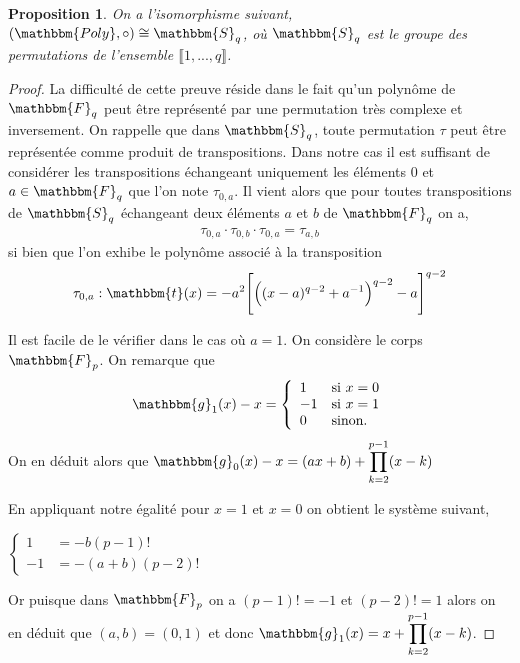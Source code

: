 \documentclass[12pt]{article}
\newtheorem{prop}{Proposition}
\theoremstyle{definition}
\begin{document}
\begin{prop}
 On a l'isomorphisme suivant, $(\mathbbm{Poly}, \circ) \cong \mathbbm{S}_q$, où $\mathbbm{S}_q$ est le groupe des permutations de l'ensemble $\llbracket 1, ... , q \rrbracket$.
\end{prop}

\begin{proof}
La difficulté de cette preuve réside dans le fait qu'un polynôme de $\mathbbm{F}_q$ peut être représenté par une permutation très complexe et inversement. On rappelle que dans $\mathbbm{S}_q$, toute permutation $\tau$ peut être représentée comme produit de transpositions. Dans notre cas il est suffisant de considérer les transpositions échangeant uniquement les éléments $0$ et $a \in \mathbbm{F}_q$ que l'on note $\tau_{0,a}$. Il vient alors que pour toutes transpositions de $\mathbbm{S}_q$ échangeant deux éléments $a$ et $b$ de $\mathbbm{F}_q$ on a,
\begin{align*}
\tau_{0,a} \cdot \tau_{0,b} \cdot \tau_{0,a} = \tau_{a,b}
\end{align*}
si bien que l'on exhibe le polynôme associé à la transposition
\begin{align*}
\tau_{0,a} : \mathbbm{t} (x) = -a^2 \Bigg [ \Big ((x-a)^{q-2} + a^{-1} \Big )^{q-2} - a \Bigg ]^{q-2}
\end{align*}

Il est facile de le vérifier dans le cas où $a = 1$. On considère le corps $\mathbbm{F}_p$. On remarque que 
	$$
\mathbbm{g}_1 (x) - x = \left\{
    \begin{array}{ll}
        1 & \mbox{si } x = 0 \\
       -1 & \mbox{si } x = 1 \\
       0 & \mbox{sinon.}
    \end{array}
\right.
$$
On en déduit alors que $\displaystyle \mathbbm{g}_0  (x)- x = (ax + b) +  \prod_{k=2}^{p-1} (x-k)$

En appliquant notre égalité pour $x=1$ et $x=0$ on obtient le système suivant,
\begin{center}
$
\left\{
    \begin{array}{ll}
    	1 &= -b(p-1)!\\
    	-1 &= -(a+b)(p-2)!
    \end{array}
\right.
$
\end{center}
Or puisque dans $\mathbbm{F}_p$ on a $(p-1)! = -1$ et $(p-2)! = 1$ alors on en déduit que $(a,b) = (0,1)$ et donc $\displaystyle \mathbbm{g}_1 (x) = x +  \prod_{k=2}^{p-1} (x-k)$.
\end{proof}
\end{document}
